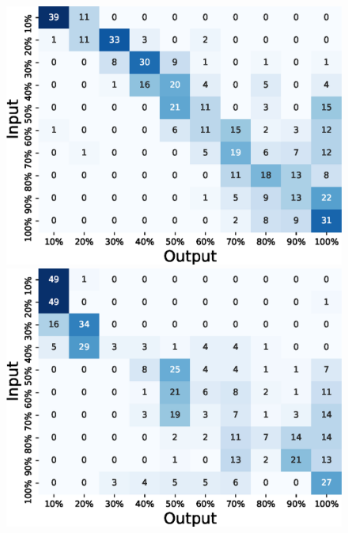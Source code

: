 \documentclass[sigconf]{acmart}
\begin{document}
\begin{figure}[!t]
\begin{minipage}[t]{0.32\linewidth}
  \end{minipage}
  \begin{minipage}[t]{0.32\linewidth}
    \centering
    \includegraphics[width=0.9\linewidth]{figures/confusion_matrix_10_independent_shampoo.eps}
  \end{minipage}
  \begin{minipage}[t]{0.32\linewidth}
    \centering
    \includegraphics[width=0.9\linewidth]{figures/confusion_matrix_10_independent_skinmilk.eps}
  \end{minipage}
  \begin{minipage}[t]{0.32\linewidth}
    \centering

\end{minipage}
\end{figure}
\end{document}
